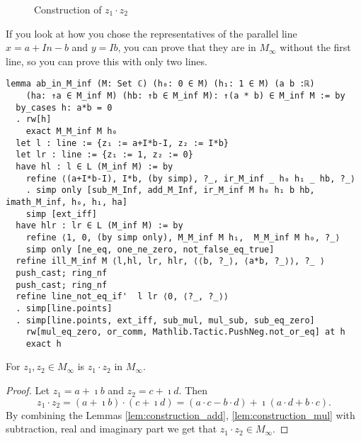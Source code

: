 \begin{figure}[h!]
    \centering
    \caption{Construction of $z_1 \cdot z_2$}
    \label{Fig.5}
\end{figure}

\begin{remark}
    If you look at how you chose the representatives of the parallel line $x = a+In-b$ and $y=Ib$, you can prove that they are in $M_{\infty}$ without the first line, so you can prove this with only two lines.
\end{remark}

\begin{lstlisting}
lemma ab_in_M_inf (M: Set ℂ) (h₀: 0 ∈ M) (h₁: 1 ∈ M) (a b :ℝ) 
    (ha: ↑a ∈ M_inf M) (hb: ↑b ∈ M_inf M): ↑(a * b) ∈ M_inf M := by
  by_cases h: a*b = 0
  . rw[h]
    exact M_M_inf M h₀
  let l : line := {z₁ := a+I*b-I, z₂ := I*b}
  let lr : line := {z₁ := 1, z₂ := 0}
  have hl : l ∈ L (M_inf M) := by
    refine ⟨(a+I*b-I), I*b, (by simp), ?_, ir_M_inf _ h₀ h₁ _ hb, ?_⟩
    . simp only [sub_M_Inf, add_M_Inf, ir_M_inf M h₀ h₁ b hb, imath_M_inf, h₀, h₁, ha]
    simp [ext_iff]
  have hlr : lr ∈ L (M_inf M) := by
    refine ⟨1, 0, (by simp only), M_M_inf M h₁,  M_M_inf M h₀, ?_⟩
    simp only [ne_eq, one_ne_zero, not_false_eq_true]
  refine ill_M_inf M ⟨l,hl, lr, hlr, ⟨⟨b, ?_⟩, ⟨a*b, ?_⟩⟩, ?_ ⟩
  push_cast; ring_nf
  push_cast; ring_nf
  refine line_not_eq_if'  l lr ⟨0, ⟨?_, ?_⟩⟩
  . simp[line.points]
  . simp[line.points, ext_iff, sub_mul, mul_sub, sub_eq_zero]
    rw[mul_eq_zero, or_comm, Mathlib.Tactic.PushNeg.not_or_eq] at h
    exact h
\end{lstlisting}

\begin{corollary}
    \label{cor:construction_mul_complex}
    For $z_1, z_2 \in M_{\infty}$ is $z_1 \cdot z_2$ in $M_{\infty}$.
\end{corollary}
\begin{proof}
    Let $z_1 = a + \imath b$ and $z_2 = c + \imath d$. Then $$z_1 \cdot z_2 = (a + \imath b) \cdot (c + \imath d) = (a \cdot c - b \cdot d) + \imath (a \cdot d + b \cdot c).$$
    By combining the Lemmas \ref{lem:construction_add}, \ref{lem:construction_mul} with subtraction, real and imaginary part we get that $z_1 \cdot z_2 \in M_{\infty}$.
\end{proof}

